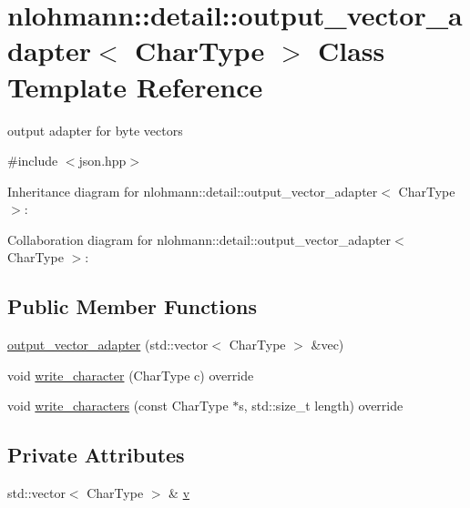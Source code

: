\hypertarget{classnlohmann_1_1detail_1_1output__vector__adapter}{}\section{nlohmann\+:\+:detail\+:\+:output\+\_\+vector\+\_\+adapter$<$ Char\+Type $>$ Class Template Reference}
\label{classnlohmann_1_1detail_1_1output__vector__adapter}


output adapter for byte vectors  




{\ttfamily \#include $<$json.\+hpp$>$}



Inheritance diagram for nlohmann\+:\+:detail\+:\+:output\+\_\+vector\+\_\+adapter$<$ Char\+Type $>$\+:


Collaboration diagram for nlohmann\+:\+:detail\+:\+:output\+\_\+vector\+\_\+adapter$<$ Char\+Type $>$\+:
\subsection*{Public Member Functions}
\begin{DoxyCompactItemize}
\item 
\hyperlink{classnlohmann_1_1detail_1_1output__vector__adapter_abc6695e8c0274afad31bd581c8acf24f}{output\+\_\+vector\+\_\+adapter} (std\+::vector$<$ Char\+Type $>$ \&vec)
\item 
void \hyperlink{classnlohmann_1_1detail_1_1output__vector__adapter_af6a22d4210bb7bc2da66021300ddd6db}{write\+\_\+character} (Char\+Type c) override
\item 
void \hyperlink{classnlohmann_1_1detail_1_1output__vector__adapter_ad6f6c461dec7bedd5359454dc22fc9aa}{write\+\_\+characters} (const Char\+Type $\ast$s, std\+::size\+\_\+t length) override
\end{DoxyCompactItemize}
\subsection*{Private Attributes}
\begin{DoxyCompactItemize}
\item 
std\+::vector$<$ Char\+Type $>$ \& \hyperlink{classnlohmann_1_1detail_1_1output__vector__adapter_a9b1ed9fba14e671ae1abb6692560ef3f}{v}
\end{DoxyCompactItemize}



